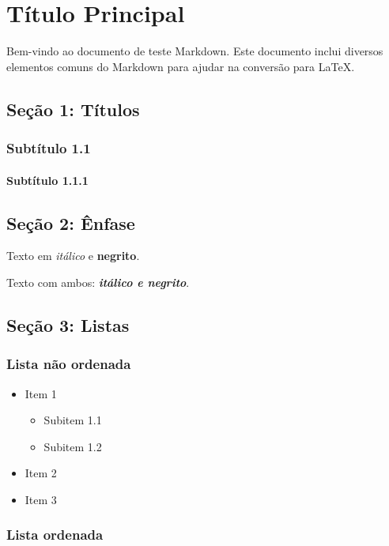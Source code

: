 \section*{Título Principal}

Bem-vindo ao documento de teste Markdown. Este documento inclui diversos elementos comuns do Markdown para ajudar na conversão para LaTeX.

\subsection*{Seção 1: Títulos}

\subsubsection*{Subtítulo 1.1}

\paragraph*{Subtítulo 1.1.1}

\subsection*{Seção 2: Ênfase}

Texto em \textit{itálico} e \textbf{negrito}.

Texto com ambos: \textbf{\textit{itálico e negrito}}.

\subsection*{Seção 3: Listas}

\subsubsection*{Lista não ordenada}

\begin{itemize}
	\item Item 1
	\begin{itemize}
		\item Subitem 1.1
		\item Subitem 1.2
	\end{itemize}
	\item Item 2
	\item Item 3
\end{itemize}

\subsubsection*{Lista ordenada}


